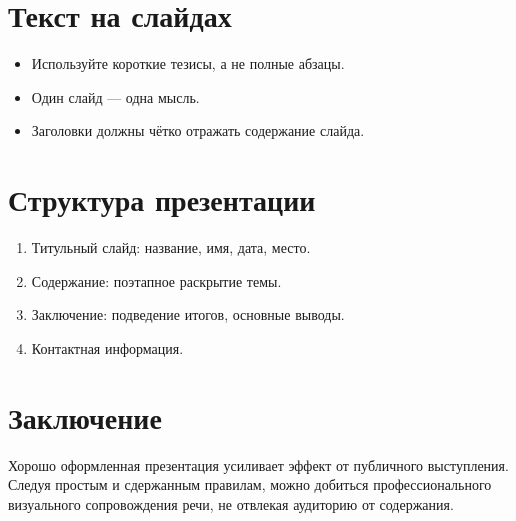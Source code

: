 \section*{Текст на слайдах}

\begin{itemize}
	\item Используйте короткие тезисы, а не полные абзацы.
	\item Один слайд — одна мысль.
	\item Заголовки должны чётко отражать содержание слайда.
\end{itemize}

\section*{Структура презентации}

\begin{enumerate}
	\item Титульный слайд: название, имя, дата, место.
	\item Содержание: поэтапное раскрытие темы.
	\item Заключение: подведение итогов, основные выводы.
	\item Контактная информация.
\end{enumerate}

\section*{Заключение}

Хорошо оформленная презентация усиливает эффект от публичного выступления. Следуя простым и сдержанным правилам, можно добиться профессионального визуального сопровождения речи, не отвлекая аудиторию от содержания.
